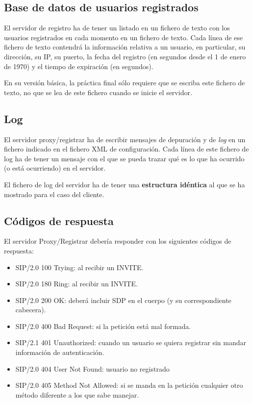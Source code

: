\documentclass[a4paper,11pt]{article}
\begin{document}
\subsection{Base de datos de usuarios registrados}

El servidor de registro ha de tener un listado en un fichero de texto con los usuarios registrados en cada momento en un fichero de texto. Cada línea de ese fichero de texto contendrá la información relativa a un usuario, en particular, su dirección, su IP, su puerto, la fecha del registro (en segundos desde el 1 de enero de 1970) y el tiempo de expiración (en segundos).

En su versión básica, la práctica final sólo requiere que se escriba este fichero de texto, no que se lea de este fichero cuando se inicie el servidor.

\subsection{Log}


El servidor proxy/registrar ha de escribir mensajes de depuración y de \emph{log} en un fichero indicado en el fichero XML de configuración. Cada línea de este fichero de log ha de tener un mensaje con el que se pueda trazar qué es lo que ha ocurrido (o está ocurriendo) en el servidor.

El fichero de log del servidor ha de tener una {\bf estructura idéntica} al que se
ha mostrado para el caso del cliente.

\subsection{Códigos de respuesta}

El servidor Proxy/Registrar debería responder con los siguientes códigos
de respuesta:

   \begin{itemize}
     \item SIP/2.0 100 Trying: al recibir un INVITE.
     \item SIP/2.0 180 Ring: al recibir un INVITE.
     \item SIP/2.0 200 OK: deberá incluir SDP en el cuerpo (y su correspondiente cabecera).
     \item SIP/2.0 400 Bad Request: si la petición está mal formada.
     \item SIP/2.1 401 Unauthorized: cuando un usuario se quiera registrar sin mandar información de autenticación.
     \item SIP/2.0 404 User Not Found: usuario no registrado
     \item SIP/2.0 405 Method Not Allowed: si se manda en la petición cualquier otro método diferente a los que sabe manejar.
   \end{itemize}
\end{document}
